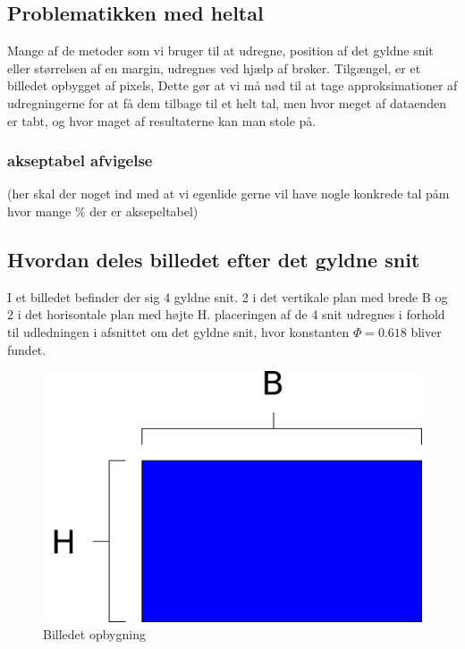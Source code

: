 
\subsection*{Problematikken med heltal}
Mange af de metoder som vi bruger til at udregne, position af det gyldne
snit eller størrelsen af en margin, udregnes ved hjælp af brøker.
Tilgængel, er et billedet opbygget af pixels, Dette gør at vi må nød
til at tage approksimationer af udregningerne for at få dem tilbage til et
helt tal, men hvor meget af dataenden er tabt, og hvor maget af
resultaterne kan man stole på.

\subsubsection{akseptabel afvigelse}
(her skal der noget ind med at vi egenlide gerne vil have nogle konkrede
tal påm hvor mange $\%$ der er aksepeltabel)

\subsection{Hvordan deles billedet efter det gyldne snit}
I et billedet befinder der sig 4 gyldne snit. 2 i det vertikale plan med
brede B og 2 i det horisontale plan med højte H. placeringen af de 4
snit udregnes i forhold til udledningen i afsnittet om det gyldne snit,
hvor konstanten $\varPhi = 0.618$ bliver fundet.

\begin{figure}[h]
	\begin{center}
		\includegraphics[scale=0.42,angle=0]{afsnit/vores_implementation/billeder/naiv_algoritme/path2407}
	\end{center}
	\caption[]{Billedet opbygning}
	\label{lenasnit}
\end{figure}

